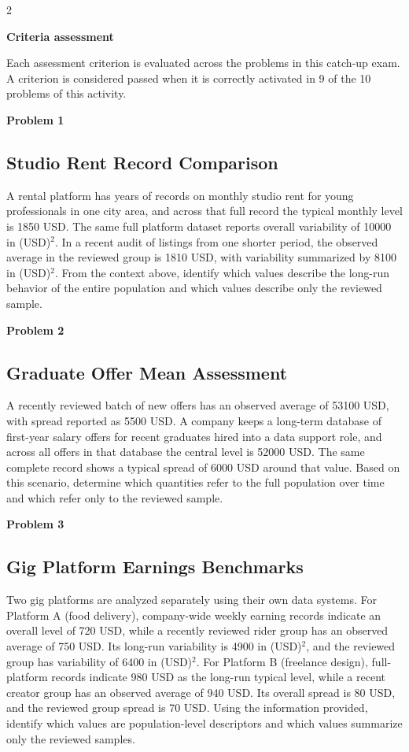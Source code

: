 \documentclass[12pt]{article}
\newcommand{\SubsectionBox}[1]{%
\noindent\colorbox{gray!30}{\parbox{\linewidth}{\textbf{#1}}}\par\vspace{0.35cm}%
}
\begin{document}
\begin{multicols}{2}
	\SubsectionBox{Criteria assessment}\vspace{-0.25cm}
	Each assessment criterion is evaluated across the problems in this catch-up exam. A criterion is considered passed when it is correctly activated in 9 of the 10 problems of this activity.

	\vspace{0.25cm}
\SubsectionBox{Problem 1}
\subsection*{Studio Rent Record Comparison}
A rental platform has years of records on monthly studio rent for young professionals in one city area, and across that full record the typical monthly level is 1850 USD.
		The same full platform dataset reports overall variability of 10000 in (USD)$^2$.
		In a recent audit of listings from one shorter period, the observed average in the reviewed group is 1810 USD, with variability summarized by 8100 in (USD)$^2$.
		From the context above, identify which values describe the long-run behavior of the entire population and which values describe only the reviewed sample.

\vspace{0.5cm}
\SubsectionBox{Problem 2}
\subsection*{Graduate Offer Mean Assessment}
A recently reviewed batch of new offers has an observed average of 53100 USD, with spread reported as 5500 USD.
		A company keeps a long-term database of first-year salary offers for recent graduates hired into a data support role, and across all offers in that database the central level is 52000 USD.
		The same complete record shows a typical spread of 6000 USD around that value.
		Based on this scenario, determine which quantities refer to the full population over time and which refer only to the reviewed sample.

\vspace{0.5cm}
\SubsectionBox{Problem 3}
\subsection*{Gig Platform Earnings Benchmarks}
Two gig platforms are analyzed separately using their own data systems.
		For Platform A (food delivery), company-wide weekly earning records indicate an overall level of 720 USD, while a recently reviewed rider group has an observed average of 750 USD.
		Its long-run variability is 4900 in (USD)$^2$, and the reviewed group has variability of 6400 in (USD)$^2$.
		For Platform B (freelance design), full-platform records indicate 980 USD as the long-run typical level, while a recent creator group has an observed average of 940 USD.
		Its overall spread is 80 USD, and the reviewed group spread is 70 USD.
		Using the information provided, identify which values are population-level descriptors and which values summarize only the reviewed samples.


\end{multicols}
\end{document}
